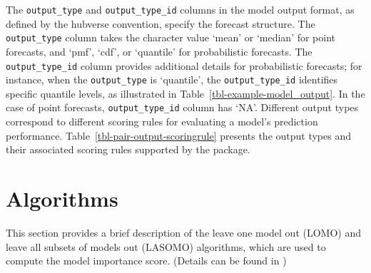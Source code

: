 \documentclass[
  article,
  shortnames,
  notitle]{jss}
\begin{document}
The \texttt{output\_type} and \texttt{output\_type\_id} columns in the
model output format, as defined by the hubverse convention, specify the
forecast structure. The \texttt{output\_type} column takes the character
value `mean' or `median' for point forecasts, and `pmf', `cdf', or
`quantile' for probabilistic forecasts. The \texttt{output\_type\_id}
column provides additional details for probabilistic forecasts; for
instance, when the \texttt{output\_type} is `quantile', the
\texttt{output\_type\_id} identifies specific quantile levels, as
illustrated in Table~\ref{tbl-example-model_output}. In the case of
point forecasts, \texttt{output\_type\_id} column has `NA'. Different
output types correspond to different scoring rules for evaluating a
model's prediction performance. Table~\ref{tbl-pair-output-scoringrule}
presents the output types and their associated scoring rules supported
by the  package.

\begin{table}


\caption{\label{tbl-pair-output-scoringrule}Pairs of output types and
their associated scoring rules for evaluating prediction performance.}

\end{table}%

\section{Algorithms}\label{sec:algorithms}

This section provides a brief description of the leave one model out
(LOMO) and leave all subsets of models out (LASOMO) algorithms, which
are used to compute the model importance score. (Details can be found in
\citet{kim2024})
\end{document}
